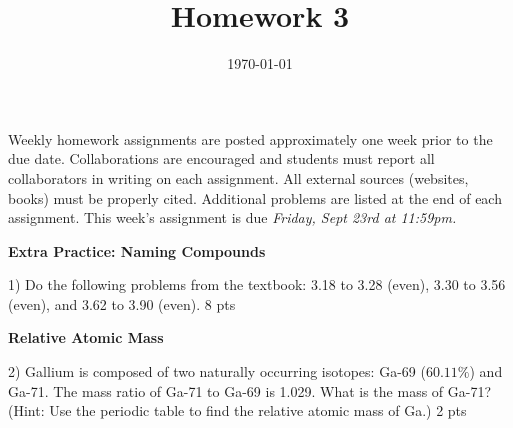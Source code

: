 \documentclass[12pt]{article}
\title{\textbf{Homework 3}}
\date{\vspace{-2em}\today}
\begin{document}
\maketitle 

Weekly homework assignments are posted approximately one week prior to the
due date. Collaborations are encouraged and students must report all collaborators
in writing on each assignment. All external sources (websites, books) must be
properly cited. Additional problems are listed at the end of each assignment.
This week's assignment is due \textit{Friday, Sept 23rd at 11:59pm.}

\textbf{Extra Practice: Naming Compounds}

1) Do the following problems from the textbook: 3.18 to 3.28 (even), 3.30 to
3.56 (even), and 3.62 to 3.90 (even). 8 pts

\vspace{1in}

\textbf{Relative Atomic Mass}

2) Gallium is composed of two naturally occurring isotopes: Ga-69 ($60.11\%$) and
Ga-71. The mass ratio of Ga-71 to Ga-69 is 1.029. What is the mass of Ga-71? (Hint:
Use the periodic table to find the relative atomic mass of Ga.) 2 pts

\vfill
\end{document}
